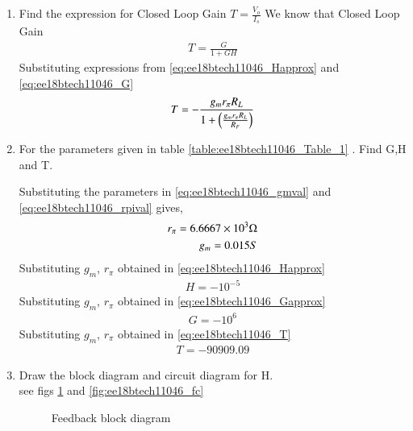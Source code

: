 \begin{enumerate}[label=\arabic*.,ref=\theenumi]
%
\item Find the expression for Closed Loop Gain $T = \frac{V_{o}}{I_{s}}$
%
We know that Closed Loop Gain
\begin{align}
T = \frac{G}{1+GH}
\end{align}
Substituting expressions from \eqref{eq:ee18btech11046_Happrox} and \eqref{eq:ee18btech11046_G}
\begin{align}
T = -\frac{g_{m}r_{\pi}R_{L}}{1+\left(\frac{g_{m}r_{\pi}R_{L}}{R_{F}}\right)}
\label{eq:ee18btech11046_T}
\end{align}
%

\item For the parameters given in table \ref{table:ee18btech11046_Table_1} . Find G,H and T.
%
\begin{table}[!ht]
\centering

\caption{}
\label{table:ee18btech11046_Table_1}
\end{table}
%
\solution
Substituting the parameters in \eqref{eq:ee18btech11046_gmval} and \eqref{eq:ee18btech11046_rpival} gives,
\begin{align}
r_{\pi} = 6.6667\times 10^{3} \ohm
\\
g_{m} = 0.015 S 
\end{align}
Substituting $g_{m}$, $r_{\pi}$ obtained in 
\eqref{eq:ee18btech11046_Happrox}
\begin{align}
H = -10^{-5}
\end{align}
Substituting $g_{m}$, $r_{\pi}$ obtained in 
\eqref{eq:ee18btech11046_Gapprox}
\begin{align}
G = -10^{6}
\end{align}
Substituting $g_{m}$, $r_{\pi}$ obtained in 
\eqref{eq:ee18btech11046_T}
\begin{align}
T = -90909.09
\end{align}

\item Draw the block diagram and circuit diagram for H.
\\
\solution see figs \ref{fig:ee18btech11046_Hblock}  and \ref{fig:ee18btech11046_fc}
%
\renewcommand{\thefigure}{\theenumi.\arabic{figure}}

\begin{figure}[ht!]
	\begin{center}
		\resizebox{\columnwidth}{!}{}
	\end{center}
	\caption{Feedback block diagram}
	\label{fig:ee18btech11046_Hblock}
\end{figure}


\end{enumerate}
